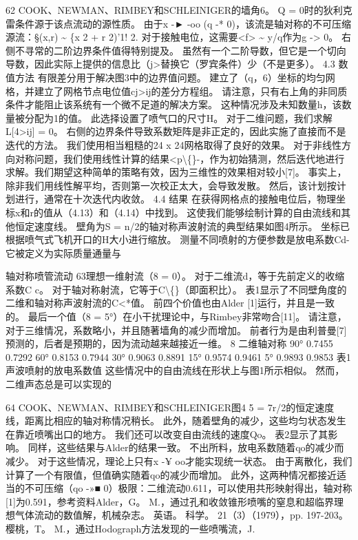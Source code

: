 \documentclass[UTF8,11pt,a4paper,openany,fontset=fandol]{ctexbook}
\begin{document}
62 COOK、NEWMAN、RIMBEY和SCHLEINIGER的墙角6。 Q = 0时的狄利克雷条件源于该点流动的源性质。 由于x -► -oo (q -* 0)，该流是轴对称的不可压缩源流：§(x,r) \textasciitilde{} \{x 2 + r 2)'1! 2. 对于接触电位，这需要<f> \textasciitilde{} y/q作为g -> 0。 右侧不寻常的二阶边界条件值得特别提及。 虽然有一个二阶导数，但它是一个切向导数，因此实际上提供的信息比（j>替换它（罗宾条件）少（不是更多）。 4.3 数值方法 有限差分用于解决图3中的边界值问题。 建立了（q，6）坐标的均匀网格，并建立了网格节点电位值cj>ij的差分方程组。 请注意，只有右上角的非同质条件才能阻止该系统有一个微不足道的解决方案。 这种情况涉及未知数量h，该数量被分配为1的值。 此选择设置了喷气口的尺寸H。 对于二维问题，我们求解L[4>ij] = 0。 右侧的边界条件导致系数矩阵是非正定的，因此实施了直接而不是迭代的方法。 我们使用相当粗糙的24 x 24网格取得了良好的效果。 对于非线性方向对称问题，我们使用线性计算的结果<p\textbackslash\{\}-，作为初始猜测，然后迭代地进行求解。我们期望这种简单的策略有效，因为三维性的效果相对较小[7]。 事实上，除非我们用线性解平均，否则第一次校正太大，会导致发散。 然后，该计划按计划进行，通常在十次迭代内收敛。 4.4 结果 在获得网格点的接触电位后，物理坐标x和r的值从（4.13）和（4.14）中找到。 这使我们能够绘制计算的自由流线和其他恒定速度线。 壁角为S = n/2的轴对称声波射流的典型结果如图4所示。 坐标已根据喷气式飞机开口的H大小进行缩放。 测量不同喷射的方便参数是放电系数Cd-它被定义为实际质量通量与

轴对称喷管流动 63理想一维射流（8 = 0）。 对于二维流d，等于先前定义的收缩系数C c。 对于轴对称射流，它等于C\textbackslash\{\}（即面积比）。 表1显示了不同壁角度的二维和轴对称声波射流的C<*值。 前四个价值也由Alder [1]运行，并且是一致的。 最后一个值（8 = 5°）在小干扰理论中，与Rimbey非常吻合[11]。 请注意，对于三维情况，系数略小，并且随著墙角的减少而增加。 前者行为是由利普曼[7]预测的，后者是预期的，因为流动越来越接近一维。 8 二维轴对称 90° 0.7455 0.7292 60° 0.8153 0.7944 30° 0.9063 0.8891 15° 0.9574 0.9461 5° 0.9893 0.9853 表1 声波喷射的放电系数值 这些情况中的自由流线在形状上与图1所示相似。 然而，二维声态总是可以实现的

64 COOK、NEWMAN、RIMBEY和SCHLEINIGER图4 5 = 7r/2的恒定速度线，距离比相应的轴对称情况稍长。 此外，随着壁角的减少，这些均匀状态发生在靠近喷嘴出口的地方。 我们还可以改变自由流线的速度Qo。 表2显示了其影响。 同样，这些结果与Alder的结果一致。 不出所料，放电系数随着qo的减少而减少。 对于这些情况，理论上只有x -¥ oo才能实现统一状态。 由于离散化，我们计算了一个有限值，但值确实随着qo的减少而增加。 此外，这两种情况都接近适当的不可压缩（qo -»■ 0）极限：二维流动0.611，可以使用共形映射得出，轴对称[1]为0.591，参考资料Alder，G。 M.，通过孔和收敛锥形喷嘴的窒息和超临界理想气体流动的数值解，机械杂志。 英语。 科学。 21（3）（1979），pp. 197-203。 樱桃，T。 M.，通过Hodograph方法发现的一些喷嘴流，J.
\end{document}
